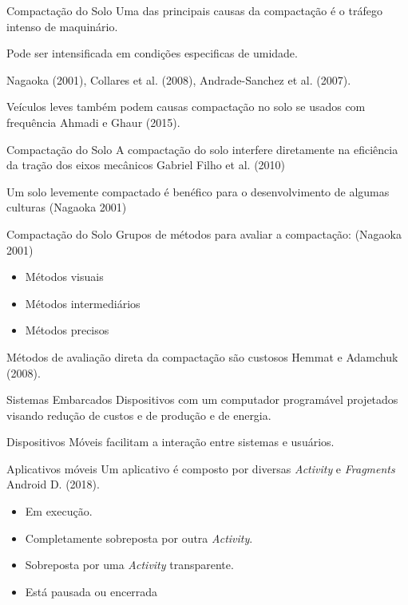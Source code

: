 \documentclass[12pt]{beamer}
\begin{document}
\begin{frame}{Compactação do Solo}
    Uma das principais causas da compactação é o tráfego intenso de maquinário.
    
    Pode ser intensificada em condições especificas de umidade. 
    
    Nagaoka (2001), Collares et al. (2008), Andrade-Sanchez et al. (2007). \nocite{nagaoka2001desenvolvimento, collares2008compactaccao, andrade2007development}
    
    Veículos leves também podem causas compactação no solo se usados com frequência Ahmadi e Ghaur (2015).
\end{frame}

\begin{frame}{Compactação do Solo}
        A compactação do solo interfere diretamente na eficiência da tração dos eixos mecânicos Gabriel Filho et al. (2010)
        
        Um solo levemente compactado é benéfico para o desenvolvimento de algumas culturas (Nagaoka 2001)
\end{frame}

\begin{frame}{Compactação do Solo}
    Grupos de métodos para avaliar a compactação: (Nagaoka 2001)
    \begin{itemize}
        \item Métodos visuais
        \item Métodos intermediários
        \item Métodos precisos
    \end{itemize}
    
    Métodos de avaliação direta da compactação são custosos Hemmat e Adamchuk (2008). \nocite{hemmat2008sensor}

\end{frame}

\begin{frame}{Sistemas Embarcados}
    Dispositivos com um computador programável projetados visando redução de custos e de produção e de energia.
    
    Dispositivos Móveis facilitam a interação entre sistemas e usuários.
\end{frame}

\begin{frame}{Aplicativos móveis}
    Um aplicativo é composto por diversas \textit{Activity} e \textit{Fragments} Android D. (2018). \nocite{AppActv}
    \begin{itemize}
        \item Em execução.
        \item Completamente sobreposta por outra \textit{Activity}.
        \item Sobreposta por uma \textit{Activity} transparente.
        \item Está pausada ou encerrada
    \end{itemize}
    
\end{frame}
\end{document}
